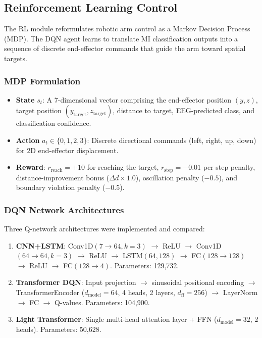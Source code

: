 \documentclass[12pt, a4paper]{article}
\begin{document}
\subsection{Reinforcement Learning Control}

The RL module reformulates robotic arm control as a Markov Decision Process (MDP). The DQN agent learns to translate MI classification outputs into a sequence of discrete end-effector commands that guide the arm toward spatial targets.

\subsubsection{MDP Formulation}

\begin{itemize}
    \item \textbf{State} $s_t$: A 7-dimensional vector comprising the end-effector position $(y, z)$, target position $(y_\text{target}, z_\text{target})$, distance to target, EEG-predicted class, and classification confidence.
    \item \textbf{Action} $a_t \in \{0, 1, 2, 3\}$: Discrete directional commands (left, right, up, down) for 2D end-effector displacement.
    \item \textbf{Reward}: $r_\text{reach} = +10$ for reaching the target, $r_\text{step} = -0.01$ per-step penalty, distance-improvement bonus ($\Delta d \times 1.0$), oscillation penalty ($-0.5$), and boundary violation penalty ($-0.5$).
\end{itemize}

\subsubsection{DQN Network Architectures}

Three Q-network architectures were implemented and compared:

\begin{enumerate}
    \item \textbf{CNN+LSTM}: Conv1D$(7 \rightarrow 64, k{=}3)$ $\rightarrow$ ReLU $\rightarrow$ Conv1D$(64 \rightarrow 64, k{=}3)$ $\rightarrow$ ReLU $\rightarrow$ LSTM$(64, 128)$ $\rightarrow$ FC$(128 \rightarrow 128)$ $\rightarrow$ ReLU $\rightarrow$ FC$(128 \rightarrow 4)$. Parameters: 129,732.
    \item \textbf{Transformer DQN}: Input projection $\rightarrow$ sinusoidal positional encoding $\rightarrow$ TransformerEncoder ($d_\text{model}{=}64$, 4 heads, 2 layers, $d_\text{ff}{=}256$) $\rightarrow$ LayerNorm $\rightarrow$ FC $\rightarrow$ Q-values. Parameters: 104,900.
    \item \textbf{Light Transformer}: Single multi-head attention layer + FFN ($d_\text{model}{=}32$, 2 heads). Parameters: 50,628.
\end{enumerate}
\end{document}
